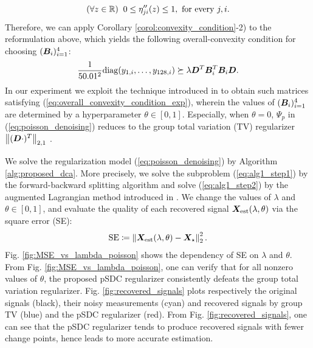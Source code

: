 \documentclass[lettersize,journal]{IEEEtran}
\theoremstyle{plain}%
\theoremstyle{definition}
\theoremstyle{remark}
\begin{document}
\begin{equation*}
(\forall z\in\mathbb{R})\;\; 0\leq \eta_{ji}''(z)\leq 1,\textrm{ for every }j,i.
\end{equation*}
Therefore, we can apply Corollary \ref{corol:convexity_condition}-2) to the reformulation above, which yields the following overall-convexity condition for choosing $(\bm{B}_i)_{i=1}^4$:
\begin{equation}\label{eq:overall_convexity_condition_exp}
\frac{1}{50.01^2}\mathrm{diag}(y_{1,i},\dots,y_{128,i})\succeq \lambda\bm{D}^T\bm{B}_i^T\bm{B}_i\bm{D}.
\end{equation}
In our experiment we exploit the technique introduced in \cite[Prop. 2]{abe2020} to obtain such matrices satisfying (\ref{eq:overall_convexity_condition_exp}), wherein the values of $(\bm{B}_i)_{i=1}^4$ are determined by a hyperparameter $\theta\in[0,1]$. Especially, when $\theta=0$, $\Psi_p$ in (\ref{eq:poisson_denoising}) reduces to the group total variation (TV) regularizer $\left\| (\bm{D}\cdot)^T \right\|_{2,1}$ \cite{selesnick2013}.

We solve the regularization model (\ref{eq:poisson_denoising}) by Algorithm \ref{alg:proposed_dca}. More precisely, we solve the subproblem (\ref{eq:alg1_step1}) by the forward-backward splitting algorithm \cite{combettes2011} and solve (\ref{eq:alg1_step2}) by the augmented Lagrangian method introduced in \cite{wu2011}. We change the values of $\lambda$ and $\theta\in[0,1]$, and evaluate the quality of each recovered signal $\bm{X}_{\textrm{est}}(\lambda,\theta)$ via the square error (SE):
\begin{equation*}
\mathrm{SE}\coloneqq \left\| \bm{X}_\mathrm{est}(\lambda,\theta)-\bm{X}_\star \right\|^2_2.
\end{equation*}
Fig. \ref{fig:MSE_vs_lambda_poisson} shows the dependency of SE on $\lambda$ and $\theta$. From Fig. \ref{fig:MSE_vs_lambda_poisson}, one can verify that for all nonzero values of $\theta$, the proposed pSDC regularizer consistently defeats the group total variation regularizer. Fig. \ref{fig:recovered_signals} plots respectively the original signals (black), their noisy measurements (cyan) and recovered signals by group TV (blue) and the pSDC regularizer (red). From Fig. \ref{fig:recovered_signals}, one can see that the pSDC regularizer tends to produce recovered signals with fewer change points, hence leads to more accurate estimation. 
\end{document}
